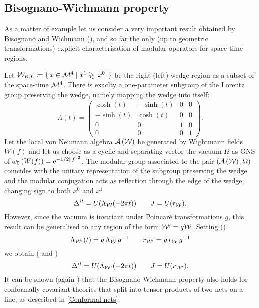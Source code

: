  \subsection{Bisognano-Wichmann property}
 \label{BiWi}
 As a matter of example let us consider a very important result obtained 
 by Bisognano and Wichmann (\cite*{BiWi:1975}), and so far the only (up to
 geometric transformations) explicit characterisation of modular operators
 for space-time regions.
 
 \medskip
 Let $\mathcal{W}_{R,L}\coloneqq \set{x\in {\mathcal{M}}^4\mid x^1\gtrless
 \lvert x^0\rvert}$ be the right (left) wedge region as a subset of the space-time
 $\mathcal{M}^4$. There is exaclty a one-parameter subgroup of the Lorentz
 group preserving the wedge, namely mapping the wedge into itself:
 \begin{equation}
 \label{Lor_boost}
 \Lambda(t)= \begin{pmatrix}
             \cosh(t)& -\sinh(t) & 0 & 0\\
             -\sinh(t)&\cosh(t) & 0 & 0\\
             0 & 0 & 1 & 0\\
             0 & 0 & 0 &1             
             \end{pmatrix}.
 \end{equation}
 Let the local von Neumann algebra $\mathcal{A}\left(\mathcal{W}\right)$ be generated by 
 Wightmann fields $W(f)$ and let us choose as a cyclic and separating vector
 the vacuum $\Omega$ as \ac{GNS} of $\omega_0\left(W(f)\right)=\operatorname{e}^{-1/2{\lVert f\rVert}^2}$. 
 The modular group associated to the pair $\left(\mathcal{A}\left(\mathcal{W}\right),\Omega\right)$
 coincides with the unitary representation of the subgroup preserving
 the wedge and the modular conjugation acts as reflection through the edge
 of the wedge, changing sign to both $x^0$ and $x^1$
 \begin{equation}
 \label{BiWi}
 \Delta^{it}=U(\Lambda_{\mathcal{W}}(-2\pi t))\qquad
 J=U(r_{\mathcal{W}}).
 \end{equation}
 However, since the vacuum is invariant under Poincar\'{e}
 transformations $g$, this result can be generalised to any
 region of the form $\mathcal{W}'= g\mathcal{W} $. Setting
 (\cite*{Longo:private})
 \[
 \Lambda_{{\mathcal{W}}'}(t)=g\,\Lambda_{\mathcal{W}}\,g^{-1}
 \qquad
 r_{{\mathcal{W}}'}=g\,r_{\mathcal{W}}\,g^{-1} 
 \]
 we obtain (\cite*{Guido:2011} and \cite*{GLW:1998})
 \[
 \Delta^{it}=U(\Lambda_{\mathcal{W}'}(-2\pi t))\qquad
 J=U(r_{\mathcal{W}'}).
 \]
 It can be shown (again \cite*{Guido:2011}) that the 
 Bisognano-Wichmann property also holds for conformally 
 covariant theories that split into tensor products of 
 two nets on a line, as described in \ref{Conformal nets}. 
